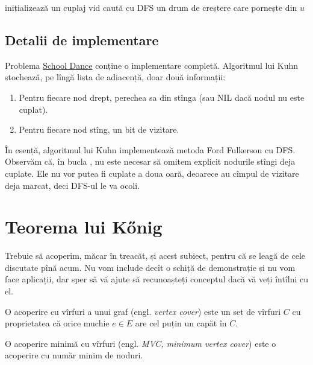 \documentclass[../main.tex]{subfiles}
\begin{document}
\begin{algorithm}[H]
  \caption{Algoritmul lui Kuhn}
  \begin{algorithmic}[1]
    \State inițializează un cuplaj vid
      \State caută cu DFS un drum de creștere care pornește din $u$
    \EndFor
  \end{algorithmic}
\end{algorithm}

\subsection{Detalii de implementare}

Problema \hyperref[problem:school-dance]{School Dance} conține o implementare completă. Algoritmul lui Kuhn stochează, pe lîngă lista de adiacență, doar două informații:

\begin{enumerate}
  \item Pentru fiecare nod drept, perechea sa din stînga (sau NIL dacă nodul nu este cuplat).
  \item Pentru fiecare nod stîng, un bit de vizitare.
\end{enumerate}

În esență, algoritmul lui Kuhn implementează metoda Ford Fulkerson cu DFS. Observăm că, în bucla , nu este necesar să omitem explicit nodurile stîngi deja cuplate. Ele nu vor putea fi cuplate a doua oară, deoarece au cîmpul de vizitare deja marcat, deci DFS-ul le va ocoli.

\section{Teorema lui Kőnig}

Trebuie să acoperim, măcar în treacăt, și acest subiect, pentru că se leagă de cele discutate pînă acum. Nu vom include decît o schiță de demonstrație și nu vom face aplicații, dar sper să vă ajute să recunoașteți conceptul dacă vă veți întîlni cu el.

\begin{definition}
  O acoperire cu vîrfuri a unui graf (engl. \textit{vertex cover}) este un set de vîrfuri $C$ cu proprietatea că orice muchie $e \in E$ are cel puțin un capăt în $C$.
\end{definition}

\begin{definition}
  O acoperire minimă cu vîrfuri (engl. \textit{MVC, minimum vertex cover}) este o acoperire cu număr minim de noduri.
\end{definition}
\end{document}
